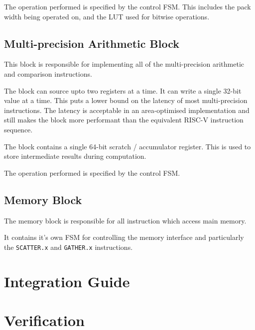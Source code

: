 \documentclass{article}
\begin{document}
The operation performed is specified by the control FSM.
This includes the pack width being operated on, and the LUT used for bitwise
operations.

\subsection{Multi-precision Arithmetic Block}

This block is responsible for implementing all of the multi-precision
arithmetic and comparison instructions.

The block can source upto two registers at a time.
It can write a single 32-bit value at a time.
This puts a lower bound on the latency of most multi-precision instructions.
The latency is acceptable in an area-optimised implementation and still
makes the block more performant than the equivalent RISC-V instruction
sequence.

The block contains a single 64-bit scratch / accumulator register.
This is used to store intermediate results during computation.

The operation performed is specified by the control FSM.

\subsection{Memory Block}

The memory block is responsible for all instruction which access main
memory.

It contains it's own FSM for controlling the memory interface
and particularly the {\tt SCATTER.x} and {\tt GATHER.x} instructions.

\section{Integration Guide}
\label{sec:integration}


\section{Verification}
\label{sec:verification}


\printbibliography
\end{document}

